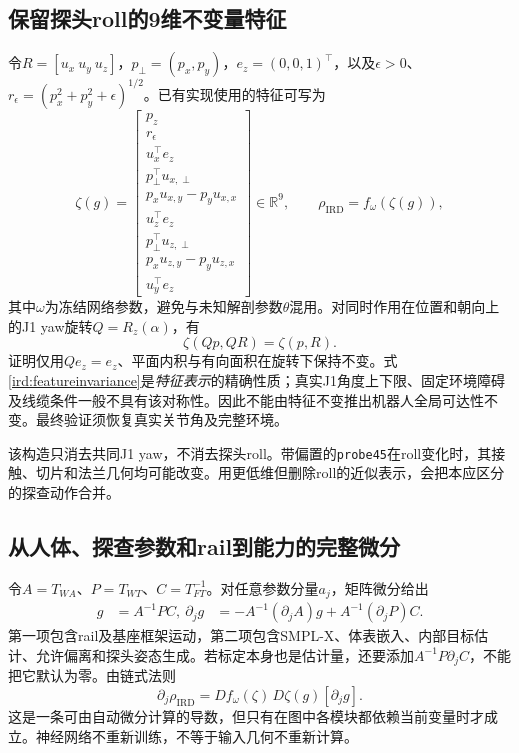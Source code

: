 \documentclass[11pt,a4paper]{article}
\numberwithin{equation}{section}
\theoremstyle{definition}
\newcommand{\R}{\mathbb R}
\begin{document}
\subsection{保留探头roll的9维不变量特征}
令$R=[u_x\ u_y\ u_z]$，$p_\perp=(p_x,p_y)$，$e_z=(0,0,1)^\top$，以及$\epsilon>0$、$r_\epsilon=(p_x^2+p_y^2+\epsilon)^{1/2}$。已有实现使用的特征可写为
\begin{equation}
 \zeta(g)=\left[
 \begin{array}{c}
 p_z\\r_\epsilon\\u_x^\top e_z\\
 p_\perp^\top u_{x,\perp}\\
 p_xu_{x,y}-p_yu_{x,x}\\
 u_z^\top e_z\\p_\perp^\top u_{z,\perp}\\
 p_xu_{z,y}-p_yu_{z,x}\\u_y^\top e_z
 \end{array}\right]\in\R^9,
 \qquad \rho_{\mathrm{IRD}}=f_{\omega}(\zeta(g)),
 \label{ird:embedding}
\end{equation}
其中$\omega$为冻结网络参数，避免与未知解剖参数$\theta$混用。对同时作用在位置和朝向上的J1 yaw旋转$Q=R_z(\alpha)$，有
\begin{equation}
 \zeta(Qp,QR)=\zeta(p,R).
 \label{ird:featureinvariance}
\end{equation}
证明仅用$Qe_z=e_z$、平面内积与有向面积在旋转下保持不变。式\eqref{ird:featureinvariance}是\emph{特征表示}的精确性质；真实J1角度上下限、固定环境障碍及线缆条件一般不具有该对称性。因此不能由特征不变推出机器人全局可达性不变。最终验证须恢复真实关节角及完整环境。

该构造只消去共同J1 yaw，不消去探头roll。带偏置的\texttt{probe45}在roll变化时，其接触、切片和法兰几何均可能改变。用更低维但删除roll的近似表示，会把本应区分的探查动作合并。

\subsection{从人体、探查参数和rail到能力的完整微分}
令$A=T_{WA}$、$P=T_{WT}$、$C=T_{FT}^{-1}$。对任意参数分量$a_j$，矩阵微分给出
\begin{align}
 g&=A^{-1}PC,\
 \partial_j g&=-A^{-1}(\partial_j A)g
       +A^{-1}(\partial_j P)C.
 \label{ird:dg}
\end{align}
第一项包含rail及基座框架运动，第二项包含SMPL-X、体表嵌入、内部目标估计、允许偏离和探头姿态生成。若标定本身也是估计量，还要添加$A^{-1}P\partial_j C$，不能把它默认为零。由链式法则
\begin{equation}
 \partial_j\rho_{\mathrm{IRD}}
 =D f_\omega(\zeta)\,D\zeta(g)[\partial_j g].
 \label{ird:chain}
\end{equation}
这是一条可由自动微分计算的导数，但只有在图中各模块都依赖当前变量时才成立。神经网络不重新训练，不等于输入几何不重新计算。
\end{document}
